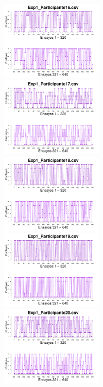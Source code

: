 \documentclass[a4paper ]{article}
\begin{document}
\begin{figure}[th]
\begin{center}
\includegraphics[width=8cm, height=4cm]{Figures/Rating_Exp1_P16} \includegraphics[width=8cm, height=4cm]{Figures/Rating_Exp1_P17} \includegraphics[width=8cm, height=4cm]{Figures/Rating_Exp1_P18}
\includegraphics[width=8cm, height=4cm]{Figures/Rating_Exp1_P19} \includegraphics[width=8cm, height=4cm]{Figures/Rating_Exp1_P20} 
\end{center}
\end{figure}
\clearpage
\end{document}
